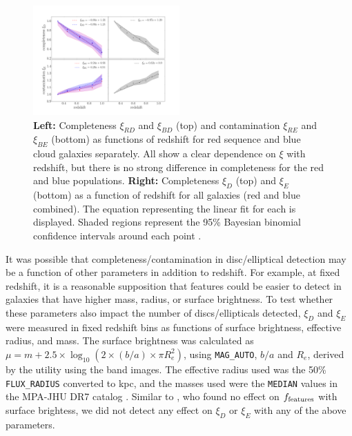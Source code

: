 \documentclass[useAMS,usenatbib]{mn2e}
\begin{document}
\begin{figure}
\centering
\includegraphics[width=0.5\textwidth,trim={3cm 1.5cm 3cm 3cm},clip]{figures/completeness_full.pdf}
\caption{\textbf{Left:} Completeness $\xi_{RD}$ and $\xi_{BD}$ (top) and contamination $\xi_{RE}$ and $\xi_{BE}$ (bottom) as functions of redshift for red sequence and blue cloud  galaxies separately. All show a clear dependence on $\xi$ with redshift, but there is no strong difference in completeness for the red and blue populations. \textbf{Right:} Completeness $\xi_D$ (top) and $\xi_E$ (bottom) as a function of redshift for all   galaxies (red and blue combined). The equation representing the linear fit for each is displayed. Shaded regions represent the 95\% Bayesian binomial confidence intervals around each point \citep{Cameron2013}. }
\label{fig:xi}
\end{figure}


It was possible that completeness/contamination in disc/elliptical detection may be a function of other parameters in addition to redshift. For example, at fixed redshift, it is a reasonable supposition that features could be easier to detect in galaxies that have higher mass, radius, or surface brightness. To test whether these parameters also impact the number of discs/ellipticals detected, $\xi_D$ and $\xi_E$ were measured in fixed redshift bins as functions of surface brightness, effective radius, and mass. The surface brightness was calculated as $\mu = m + 2.5 \times \log_{10}{(2 \times (b/a) \times \pi R_e^2 )}$, using {\tt MAG\_AUTO}, $b/a$ and $R_{e}$, derived by the \sextractor{} utility using the \Iband{} band images. The effective radius used was the 50\% {\tt FLUX\_RADIUS} converted to kpc, and the masses used were the {\tt MEDIAN} values in the MPA-JHU DR7 catalog \citep{Kauffmann2003b}. Similar to \citet{Willett2016}, who found no effect on $f_{\rm features}$ with surface brightess, we did not detect any effect on $\xi_D$ or $\xi_E$ with any of the above parameters. 
\end{document}
